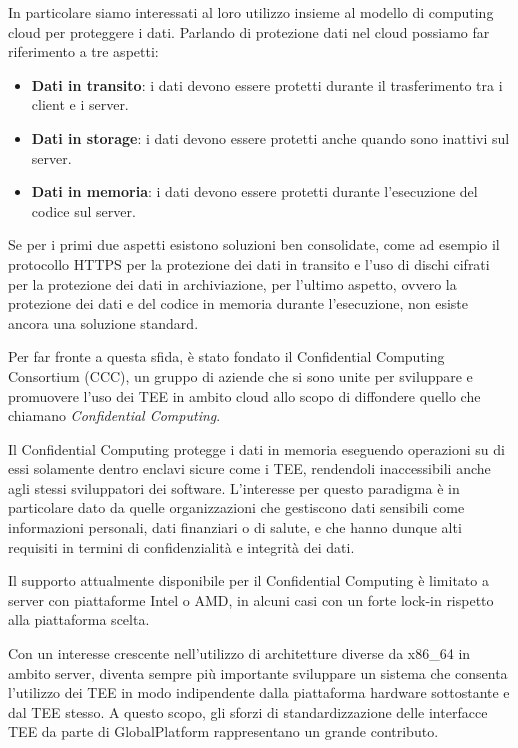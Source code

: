 \documentclass[12pt,italian]{report}
\begin{document}
In particolare siamo interessati al loro utilizzo insieme al modello di
computing cloud per proteggere i dati.
Parlando di protezione dati nel cloud possiamo far riferimento a tre
aspetti:
\begin{itemize}
    \item \textbf{Dati in transito}: i dati devono essere protetti durante
    il trasferimento tra i client e i server.
    \item \textbf{Dati in storage}: i dati devono essere protetti anche
    quando sono inattivi sul server.
    \item \textbf{Dati in memoria}: i dati devono essere protetti durante
    l'esecuzione del codice sul server.
\end{itemize}

Se per i primi due aspetti esistono soluzioni ben consolidate, come ad
esempio il protocollo HTTPS per la protezione dei dati in transito e
l'uso di dischi cifrati per la protezione dei dati in archiviazione,
per l'ultimo aspetto, ovvero la protezione dei dati e del codice in
memoria durante l'esecuzione, non esiste ancora una soluzione standard.

Per far fronte a questa sfida, è stato fondato il
Confidential Computing Consortium (CCC), un gruppo di aziende che si sono
unite per sviluppare e promuovere l'uso dei TEE in ambito cloud
allo scopo di diffondere quello che chiamano \textit{Confidential Computing}.

Il Confidential Computing protegge i dati in memoria eseguendo operazioni
su di essi solamente dentro enclavi sicure come i TEE, rendendoli
inaccessibili anche agli stessi sviluppatori dei software.
L'interesse per questo paradigma è in particolare dato da quelle organizzazioni
che gestiscono dati sensibili come informazioni personali, dati finanziari o
di salute, e che hanno dunque alti requisiti in termini di confidenzialità
e integrità dei dati.

Il supporto attualmente disponibile per il Confidential Computing è
limitato a server con piattaforme Intel o AMD, in alcuni casi con un
forte lock-in rispetto alla piattaforma scelta.

Con un interesse crescente nell'utilizzo di architetture diverse da x86\_64
in ambito server, diventa sempre più importante sviluppare un sistema che
consenta l'utilizzo dei TEE in modo indipendente dalla piattaforma
hardware sottostante e dal TEE stesso.
A questo scopo, gli sforzi di standardizzazione delle interfacce TEE da
parte di GlobalPlatform rappresentano un grande contributo.
\end{document}
